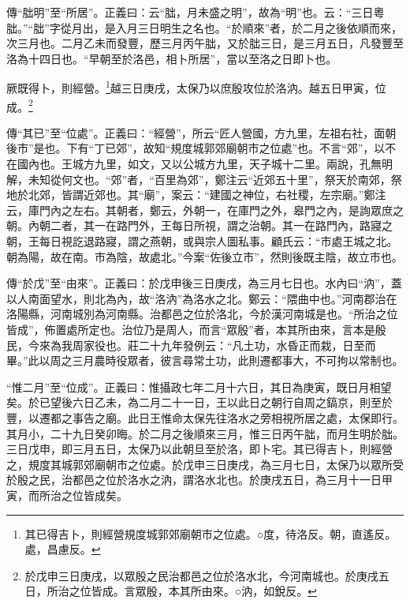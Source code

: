 {\noindent\zhuan{}\fzbyks 傳“朏明”至“所居”。正義曰：云“朏，月未盛之明”，故為“明”也。云：“三日粵朏。”“朏”字從月出，是入月三日明生之名也。“於順來”者，於二月之後依順而來，次三月也。二月乙未而發豐，歷三月丙午朏，又於朏三日，是三月五日，凡發豐至洛為十四日也。“早朝至於洛邑，相卜所居”，當以至洛之日即卜也。 \par}

厥既得卜，則經營。\footnote{其已得吉卜，則經營規度城郭郊廟朝市之位處。○度，待洛反。朝，直遙反。處，昌慮反。}越三日庚戌，太保乃以庶殷攻位於洛汭。越五日甲寅，位成。\footnote{於戊申三日庚戌，以眾殷之民治都邑之位於洛水北，今河南城也。於庚戌五日，所治之位皆成。言眾殷，本其所由來。○汭，如銳反。}

{\noindent\zhuan{}\fzbyks 傳“其已”至“位處”。正義曰：“經營”，所云“匠人營國，方九里，左祖右社，面朝後市”是也。下有“丁已郊”，故知“規度城郭郊廟朝市之位處”也。不言“郊”，以不在國內也。王城方九里，如文，又以公城方九里，天子城十二里。兩說，孔無明解，未知從何文也。“郊”者，“百里為郊”，鄭注云“近郊五十里”，祭天於南郊，祭地於北郊，皆謂近郊也。其“廟”，案云：“建國之神位，右社稷，左宗廟。”鄭注云，庫門內之左右。其朝者，鄭云，外朝一，在庫門之外，皋門之內，是詢眾庶之朝。內朝二者，其一在路門外，王每日所視，謂之治朝。其一在路門內，路寢之朝，王每日視訖退路寢，謂之燕朝，或與宗人圖私事。顧氏云：“市處王城之北。朝為陽，故在南。市為陰，故處北。”今案“佐後立市”，然則後既主陰，故立市也。 \par}

{\noindent\zhuan{}\fzbyks 傳“於戊”至“由來”。正義曰：於戊申後三日庚戌，為三月七日也。水內曰“汭”，蓋以人南面望水，則北為內，故“洛汭”為洛水之北。鄭云：“隈曲中也。”河南郡治在洛陽縣，河南城別為河南縣。治都邑之位於洛北，今於漢河南城是也。“所治之位皆成”，佈置處所定也。治位乃是周人，而言“眾殷”者，本其所由來，言本是殷民，今來為我周家役也。莊二十九年發例云：“凡土功，水昏正而栽，日至而畢。”此以周之三月農時役眾者，彼言尋常土功，此則遷都事大，不可拘以常制也。 \par}

{\noindent\shu{}\fzkt “惟二月”至“位成”。正義曰：惟攝政七年二月十六日，其日為庚寅，既日月相望矣。於已望後六日乙未，為二月二十一日，王以此日之朝行自周之鎬京，則至於豐，以遷都之事告之廟。此日王惟命太保先往洛水之旁相視所居之處，太保即行。其月小，二十九日癸卯晦。於二月之後順來三月，惟三日丙午朏，而月生明於朏。三日戊申，即三月五日，太保乃以此朝旦至於洛，即卜宅。其已得吉卜，則經營之，規度其城郭郊廟朝市之位處。於戊申三日庚戌，為三月七日，太保乃以眾所受於殷之民，治都邑之位於洛水之汭，謂洛水北也。於庚戌五日，為三月十一日甲寅，而所治之位皆成矣。 \par}

